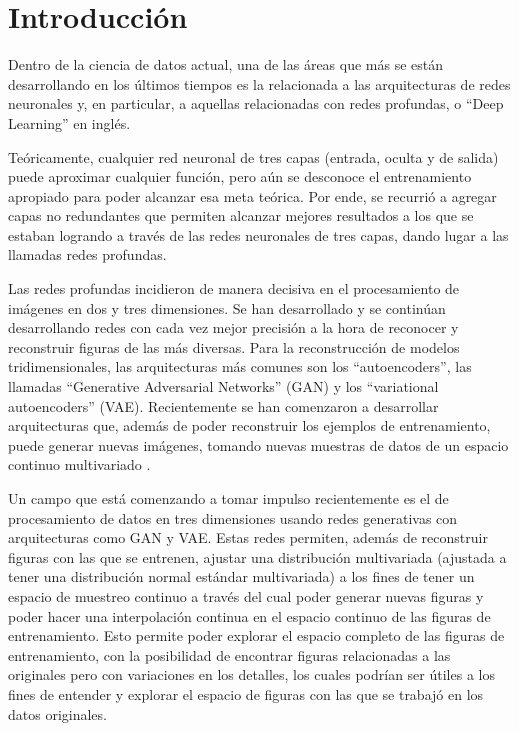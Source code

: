 \documentclass[spanish]{article}
\begin{document}




\section{Introducción}

Dentro de la ciencia de datos actual, una de las áreas que más se
están desarrollando en los últimos tiempos es la relacionada a las
arquitecturas de redes neuronales y, en particular, a aquellas relacionadas
con redes profundas, o ``Deep Learning'' en inglés.

Teóricamente, cualquier red neuronal de tres capas (entrada, oculta
y de salida) puede aproximar cualquier función, pero aún se desconoce
el entrenamiento apropiado para poder alcanzar esa meta teórica.
Por ende, se recurrió a agregar capas no redundantes que permiten
alcanzar mejores resultados a los que se estaban logrando a través
de las redes neuronales de tres capas, dando lugar a las llamadas
redes profundas.

Las redes profundas incidieron de manera decisiva en el procesamiento
de imágenes en dos y tres dimensiones. Se han desarrollado y se continúan
desarrollando redes con cada vez mejor precisión a la hora de reconocer
y reconstruir figuras de las más diversas. Para la reconstrucción
de modelos tridimensionales, las arquitecturas más comunes son los ``autoencoders'',
las llamadas ``Generative Adversarial Networks'' (GAN) y los ``variational
autoencoders'' (VAE). Recientemente se han comenzaron a desarrollar
arquitecturas que, además de poder reconstruir los ejemplos de entrenamiento,
puede generar nuevas imágenes, tomando nuevas muestras de datos de
un espacio continuo multivariado \cite{Karras2018}.

Un campo que está comenzando a tomar impulso recientemente es el de
procesamiento de datos en tres dimensiones usando redes generativas
con arquitecturas como GAN y VAE. Estas redes permiten, además de
reconstruir figuras con las que se entrenen, ajustar una distribución
multivariada (ajustada a tener una distribución normal estándar multivariada) a los fines de tener un espacio de muestreo continuo a través del cual poder generar nuevas figuras y poder hacer una interpolación continua en el espacio continuo de las figuras de entrenamiento. Esto permite poder explorar el espacio completo de las figuras de entrenamiento, con la posibilidad de encontrar figuras relacionadas a las originales pero con variaciones en los detalles, los cuales podrían ser útiles a los fines de entender y explorar el espacio de figuras con las que se trabajó en los datos originales.
\end{document}
